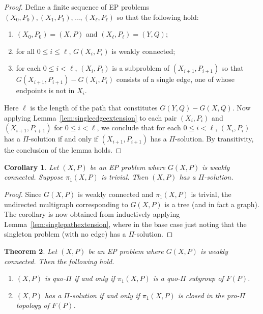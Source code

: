 \documentclass[11pt]{amsart}
\newtheorem{theorem}{Theorem}[section]
\newtheorem{corollary}[theorem]{Corollary}
\theoremstyle{definition}
\theoremstyle{definition}
\numberwithin{equation}{section}
\begin{document}
\begin{proof} Define a finite sequence of EP problems $(X_0, P_0), (X_1, P_1), \dots, (X_\ell, P_\ell)$ so that the following hold:
\begin{enumerate}
\item[\rm (i)] $(X_0, P_0)=(X, P)$ and $(X_\ell, P_\ell)=(Y, Q)$;
\item[\rm (ii)] for all $0\leq i\leq \ell$, $G(X_i, P_i)$ is weakly connected;
\item[\rm (iii)] for each $0\leq i<\ell$, $(X_i, P_i)$ is a subproblem of $(X_{i+1}, P_{i+1})$ so that $G(X_{i+1}, P_{i+1})-G(X_i, P_i)$ consists of a single edge, one of whose endpoints is not in $X_i$.
\end{enumerate}
 Here $\ell$ is the length of the path that constitutes $G(Y, Q)-G(X, Q)$. Now applying Lemma~\ref{lem:singleedgeextension} to each pair $(X_i, P_i)$ and $(X_{i+1}, P_{i+1})$ for $0\leq i<\ell$, we conclude that for each $0\leq i<\ell$, $(X_i, P_i)$ has a $\Pi$-solution if and only if $(X_{i+1}, P_{i+1})$ has a $\Pi$-solution. By transitivity, the conclusion of the lemma holds.
\end{proof}


\begin{corollary}\label{cor:trivial} Let $(X, P)$ be an EP problem where $G(X, P)$ is weakly connected. Suppose $\pi_1(X, P)$ is trivial. Then $(X, P)$ has a $\Pi$-solution.
\end{corollary}

\begin{proof} Since $G(X, P)$ is weakly connected and $\pi_1(X, P)$ is trivial, the undirected multigraph corresponding to $G(X, P)$ is a tree (and in fact a graph). The corollary is now obtained from inductively applying Lemma~\ref{lem:singlepathextension}, where in the base case just noting that the singleton problem (with no edge) has a $\Pi$-solution.
\end{proof}


\begin{theorem}\label{thm:solutionprotopology} Let $(X, P)$ be an EP problem where $G(X, P)$ is weakly connected. Then the following hold.
\begin{enumerate}
\item[\rm (i)] $(X, P)$ is quo-$\Pi$ if and only if $\pi_1(X, P)$ is a quo-$\Pi$ subgroup of $F(P)$.
\item[\rm (ii)] $(X, P)$ has a $\Pi$-solution if and only if $\pi_1(X, P)$ is closed in the pro-$\Pi$ topology of $F(P)$.
\end{enumerate}
\end{theorem}
\end{document}
